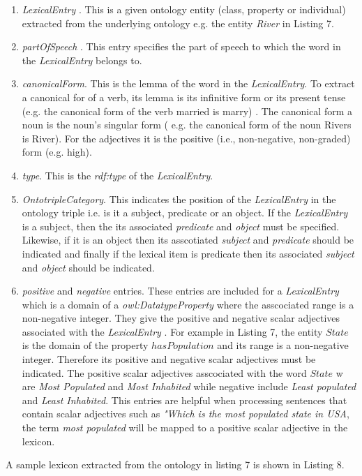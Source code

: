 \documentclass[review]{elsarticle}
\begin{document}
\begin{enumerate}
\item \textit{  LexicalEntry }. This  is a  given ontology entity (class, property or individual) extracted  from the underlying ontology e.g. the entity \textit{River} in Listing 7.
\item \textit{ partOfSpeech }. This entry specifies  the  part of speech to which the word in the  \textit{LexicalEntry} belongs to.
\item \textit{ canonicalForm}.  This is  the lemma of the word in the \textit{ LexicalEntry}. To extract a canonical for of a verb, its  lemma is  its  infinitive form or its present tense (e.g. the canonical form of the verb married  is  marry) .  The  canonical form a noun is the noun's singular form ( e.g. the canonical form of the noun Rivers is  River). For the  adjectives it is the positive (i.e., non-negative, non-graded) form (e.g. high).
\item \textit{ type}. This is the \textit{rdf:type} of the \textit{LexicalEntry}.
\item \textit{ OntotripleCategory}. This indicates the position of the \textit{ LexicalEntry} in the ontology triple i.e. is it a subject, predicate or an object. If the \textit{ LexicalEntry} is a subject, then the its associated   \textit{ predicate} and \textit{ object} must be specified. Likewise,  if it is an object then its asscotiated  \textit{subject} and \textit{ predicate} should be indicated  and finally if the lexical item is predicate then  its associated \textit{ subject} and \textit{ object} should be indicated.
\item \textit{ positive}  and \textit{negative} entries. These entries  are included for a \textit{ LexicalEntry } which is a domain of a \textit{owl:DatatypeProperty} where the asscociated  range is a non-negative integer.  They give the positive and negative scalar adjectives associated with the \textit{ LexicalEntry }. For example in Listing 7, the entity $State$  is the domain of the property $hasPopulation$ and its range is a non-negative integer. Therefore its positive and negative scalar adjectives must be indicated.  The  positive scalar adjectives asscociated with the word $State$ w are  \textit{Most Populated} and \textit{Most Inhabited} while negative include \textit{Least populated} and \textit{Least Inhabited}. This entries are helpful when processing sentences that contain scalar adjectives such as  \textit{"Which is the most populated state in USA}, the term \textit{most populated} will be mapped to a  positive scalar adjective in the lexicon.
\end{enumerate}
A sample lexicon extracted from the ontology in listing 7 is shown in Listing 8.  
\end{document}
